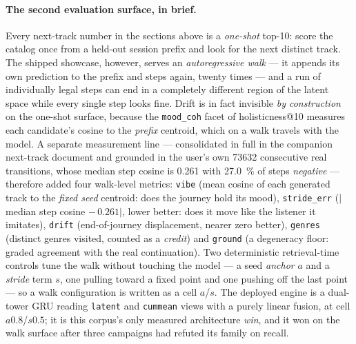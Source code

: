 \documentclass[11pt]{article}
\begin{document}
\paragraph{The second evaluation surface, in brief.}
\label{sec:nexttrack-walksurface}
Every next-track number in the sections above is a \emph{one-shot} top-10: score
the catalog once from a held-out session prefix and look for the next distinct
track. The shipped showcase, however, serves an \emph{autoregressive walk} --- it
appends its own prediction to the prefix and steps again, twenty times --- and a run
of individually legal steps can end in a completely different region of the latent
space while every single step looks fine. Drift is in fact invisible \emph{by
construction} on the one-shot surface, because the \texttt{mood\_coh} facet of
holisticness@10 measures each candidate's cosine to the \emph{prefix} centroid,
which on a walk travels with the model. A separate measurement line --- consolidated
in full in the companion next-track document and grounded in the user's own
\num{73632} consecutive real transitions, whose median step cosine is \num{0.261}
with \SI{27.0}{\percent} of steps \emph{negative} --- therefore added four
walk-level metrics: \texttt{vibe} (mean cosine of each generated track to the
\emph{fixed seed} centroid: does the journey hold its mood), \texttt{stride\_err}
($|$median step cosine $-\,\num{0.261}|$, lower better: does it move like the
listener it imitates), \texttt{drift} (end-of-journey displacement, nearer zero
better), \texttt{genres} (distinct genres visited, counted as a \emph{credit}) and
\texttt{ground} (a degeneracy floor: graded agreement with the real continuation).
Two deterministic retrieval-time controls tune the walk without touching the model
--- a seed \emph{anchor} $a$ and a \emph{stride} term $s$, one pulling toward a fixed
point and one pushing off the last point --- so a walk configuration is written as a
cell $a$/$s$. The deployed engine is a dual-tower GRU reading \texttt{latent} and
\texttt{cummean} views with a purely linear fusion, at cell
$a\num{0.8}$/$s\num{0.5}$; it is this corpus's only measured architecture
\emph{win}, and it won on the walk surface after three campaigns had refuted its
family on recall.
\end{document}
